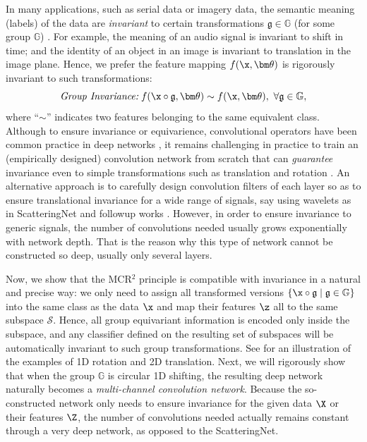 \documentclass[../../book-main.tex]{subfiles}
\begin{document}
In many applications, such as serial data or imagery data, the semantic meaning (labels) of the data are  {\em invariant} to certain transformations $\mathfrak{g} \in \mathbb{G}$ (for some group $\mathbb{G}$) \cite{CohenW16,deep-sets-NIPS2017}. For example, the meaning of an audio signal is invariant to shift in time; and the identity of an object in an image is invariant to translation in the image plane. Hence, we prefer the feature mapping $f(\x,\bm \theta)$ is rigorously invariant to such transformations:
\begin{equation}
\mbox{\em Group Invariance:}\;   f(\x\circ \mathfrak{g}, \bm \theta) \sim f(\x,\bm \theta),\ \forall \mathfrak{g} \in \mathbb{G},
\end{equation}
where ``$\sim$'' indicates two features belonging to the same equivalent class. Although to ensure invariance or equivarience, convolutional operators have been common practice in deep networks \cite{CohenW16}, it remains challenging in practice to train an (empirically designed) convolution network from scratch that can {\em guarantee} invariance even to simple transformations such as translation and rotation \cite{azulay2018deep,engstrom2017rotation}. An alternative approach is to carefully design convolution filters of each layer so as to ensure translational invariance for a wide range of signals, say using wavelets as in ScatteringNet \cite{scattering-net} and followup works \cite{Wiatowski-2018}. However, in order to ensure invariance to generic signals, the number of convolutions needed usually grows exponentially with network depth. That is the reason why this type of network cannot be constructed so deep, usually only several layers. 

Now, we show that the MCR$^2$ principle is compatible with invariance in a natural and precise way: we only need to assign all transformed versions $\{\x\circ \mathfrak{g} \mid \mathfrak{g} \in \mathbb G\}$  into the same class as the data $\x$ and map their features $\z$ all to the same subspace $\mathcal S$. Hence, all group equivariant information is encoded only inside the subspace, and any classifier defined on the resulting set of subspaces will be automatically invariant to such group transformations. See  for an illustration of the examples of 1D rotation and 2D translation.  Next, we will rigorously show that when the group $\mathbb G$ is circular 1D shifting, the resulting deep network naturally becomes a {\em multi-channel convolution network}. 
Because the so-constructed network only needs to ensure invariance for the given data $\X$ or their features $\Z$, the number of convolutions needed actually remains constant through a very deep network, as opposed to the ScatteringNet. 
\end{document}
